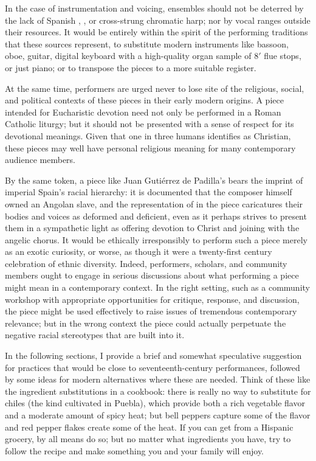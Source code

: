 In the case of instrumentation and voicing, ensembles should not be deterred by
the lack of Spanish , , or cross-strung chromatic
harp; nor by vocal ranges outside their resources.
It would be entirely within the spirit of the performing traditions that these
sources represent, to substitute modern instruments like bassoon, oboe, guitar,
digital keyboard with a high-quality organ sample of 8$'$ flue stops, or just
piano; or to transpose the pieces to a more suitable register.

At the same time, performers are urged never to lose site of the religious,
social, and political contexts of these pieces in their early modern origins.
A piece intended for Eucharistic devotion need not only be performed in a
Roman Catholic liturgy; but it should not be presented with a sense of respect
for its devotional meanings.
Given that one in three humans identifies as Christian, these pieces may well
have personal religious meaning for many contemporary audience members.

By the same token, a piece like Juan Gutiérrez de Padilla's  bears the imprint of imperial Spain's racial hierarchy: it
is documented that the composer himself owned an Angolan slave, and the
representation of  in the piece caricatures their bodies and
voices as deformed and deficient, even as it perhaps strives to present them in
a sympathetic light as offering devotion to Christ and joining with the angelic
chorus.
It would be ethically irresponsibly to perform such a piece merely as an exotic
curiosity, or worse, as though it were a twenty-first century celebration of
ethnic diversity. 
Indeed, performers, scholars, and community members ought to engage in serious
discussions about what performing a piece might mean in a contemporary context.
In the right setting, such as a community workshop with appropriate
opportunities for critique, response, and discussion, the piece might be used 
effectively to raise issues of tremendous contemporary relevance; but in the
wrong context the piece could actually perpetuate the negative racial
stereotypes that are built into it.

In the following sections, I provide a brief and somewhat speculative suggestion
for practices that would be close to seventeenth-century performances, followed
by some ideas for modern alternatives where these are needed.
Think of these like the ingredient substitutions in a cookbook: there is really
no way to substitute for  chiles (the kind cultivated in Puebla),
which provide both a rich vegetable flavor and a moderate amount of spicy heat;
but bell peppers capture some of the flavor and red pepper flakes create some of
the heat.
If you can get  from a Hispanic grocery, by all means do so; but
no matter what ingredients you have, try to follow the recipe and make something
you and your family will enjoy.

